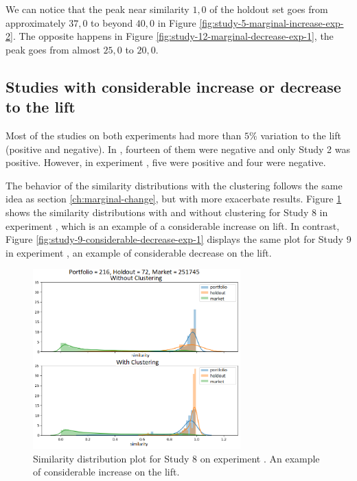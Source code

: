 We can notice that the peak near similarity $1,0$ of the holdout set goes from approximately $37,0$ to beyond $40,0$ in Figure \ref{fig:study-5-marginal-increase-exp-2}. The opposite happens in Figure \ref{fig:study-12-marginal-decrease-exp-1}, the peak goes from almost $25,0$ to $20,0$.

\subsection{Studies with considerable increase or decrease to the lift}
\label{ch:considerable-change}

Most of the studies on both experiments had more than $5\%$ variation to the lift (positive and negative). In \nameExperimentI{}, fourteen of them were negative and only Study 2 was positive. However, in experiment \nameExperimentII{}, five were positive and four were negative.

The behavior of the similarity distributions with the clustering follows the same idea as section \ref{ch:marginal-change}, but with more exacerbate results. Figure \ref{fig:study-8-considerable-increase-exp-2} shows the similarity distributions with and without clustering for Study 8 in experiment \nameExperimentII{}, which is an example of a considerable increase on lift. In contrast, Figure \ref{fig:study-9-considerable-decrease-exp-1} displays the same plot for Study 9 in experiment \nameExperimentI{}, an example of considerable decrease on the lift.

\begin{figure}[!ht]
   \centering
   \includegraphics[width=8cm]{fig/ch4-study-8-considerable-increase-exp-2.png}
   \caption{Similarity distribution plot for Study 8 on experiment \nameExperimentII{}. An example of considerable increase on the lift.}
   \label{fig:study-8-considerable-increase-exp-2}
\end{figure}

